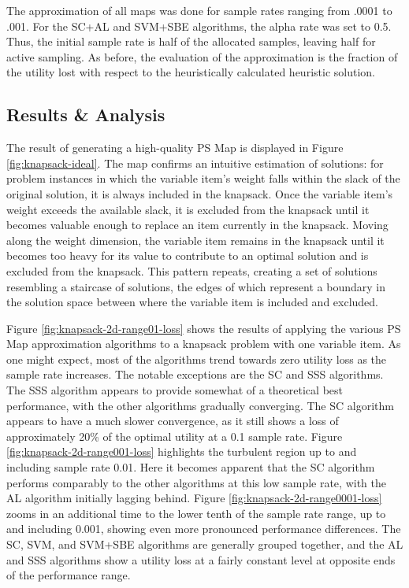 The approximation of all maps was done for  sample rates ranging from .0001 to .001.  For the SC+AL and SVM+SBE algorithms, the alpha rate was set to 0.5.  Thus, the initial sample rate is half of the allocated samples, leaving half for active sampling.  As before, the evaluation of the approximation is the fraction of the utility lost with respect to the heuristically calculated heuristic solution.




\subsection{Results \& Analysis}

The result of generating a high-quality PS Map is displayed in Figure \ref{fig:knapsack-ideal}.  The map confirms an intuitive estimation of solutions: for problem instances in which the variable item's weight falls within the slack of the  original solution, it is always included in the knapsack.  Once the variable item's weight exceeds the available slack, it is excluded from the knapsack until it becomes valuable enough to replace an item currently in the knapsack.  Moving along the weight dimension, the variable item remains in the knapsack until it becomes too heavy for its value to contribute to an optimal solution and is excluded from the knapsack.  This pattern repeats, creating a set of solutions resembling a staircase of solutions, the edges of which represent a boundary in the solution space between where the variable item is included and excluded.

Figure \ref{fig:knapsack-2d-range01-loss} shows the results of applying the various PS Map approximation algorithms to a knapsack problem with one variable item.  As one might expect, most of the algorithms trend towards zero utility loss as the sample rate increases.  The notable exceptions are the SC and SSS algorithms. The SSS algorithm appears to provide somewhat of a theoretical best performance, with the other algorithms gradually converging.  The SC algorithm appears to have a much slower convergence, as it still shows a loss of approximately 20\% of the optimal utility at a 0.1 sample rate.  Figure \ref{fig:knapsack-2d-range001-loss} highlights the turbulent region up to and including sample rate 0.01.  Here it becomes apparent that the SC algorithm performs comparably to the other algorithms at this low sample rate, with the AL algorithm initially lagging behind.  Figure \ref{fig:knapsack-2d-range0001-loss} zooms in an additional time to the lower tenth of the sample rate range, up to and including 0.001, showing even more pronounced performance differences.  The SC, SVM, and SVM+SBE algorithms are generally grouped together, and the AL and SSS algorithms show a utility loss at a fairly constant level at opposite ends of the performance range.

